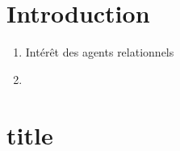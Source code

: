 \documentclass [french]{sig-alternate-05-2015}
\begin{document}
	
	\section{Introduction}
		\begin{enumerate}
			\item Intérêt des agents relationnels 
			\item 
		\end{enumerate}
	\section{title}
\end{document}
